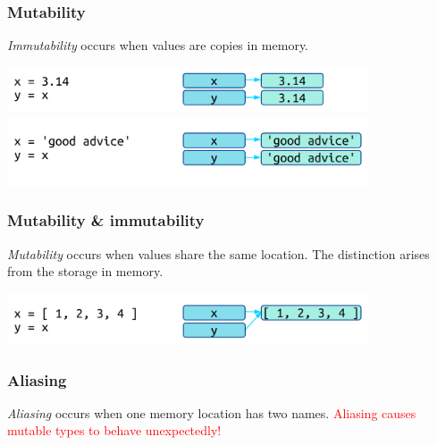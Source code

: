 \documentclass[11pt]{beamer}
\begin{document}
\begin{frame}[fragile]
  \frametitle{Mutability}
  \Enlarge

  \begin{itemize}
  \myitem  \emph{Immutability} occurs when values are copies in memory.
  \end{itemize}
  \includegraphics[width=0.8\textwidth]{./img/memory-immutability.png} \\
  \includegraphics[width=0.8\textwidth]{./img/memory-immutability-string.png}
\end{frame}

\begin{frame}[fragile]
  \frametitle{Mutability \& immutability}
  \Enlarge

  \begin{itemize}
  \myitem  \emph{Mutability} occurs when values share the same location. %
  \myitem  The distinction arises from the storage in memory.
  \end{itemize}
  \includegraphics[width=0.8\textwidth]{./img/memory-mutability.png}
\end{frame}

\begin{frame}[fragile]
  \frametitle{Aliasing}
  \Enlarge

  \begin{itemize}
  \myitem  \emph{Aliasing} occurs when one memory location has two names. %
  \myitem  \textcolor{red}{Aliasing causes mutable types to behave unexpectedly!}
  \end{itemize}
  \begin{semiverbatim}

  \end{semiverbatim}
\end{frame}
\end{document}
